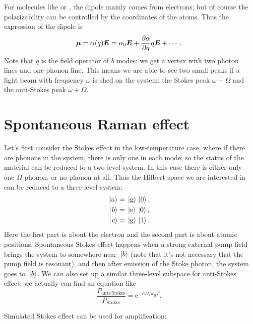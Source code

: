 \documentclass[hyperref, a4paper]{article}
\newcommand*{\ee}{\mathrm{e}}
\newcommand*{\kB}{k_{\text{B}}}
\begin{document}
For molecules like  or ,
the dipole mainly comes from electrons; 
but of course the polarizability can be controlled 
by the coordinates of the atoms.
Thus the expression of the dipole is 
\begin{equation}
    \vb*{\mu} = \alpha(q) \vb*{E} = 
    \alpha_0 \vb*{E} + \pdv{\alpha}{q} q \vb*{E} + \cdots.
\end{equation} 
Note that $q$ is the field operator of $b$ modes:
we get a vertex with two photon lines and one phonon line.
This means we are able to see two small peaks 
if a light beam with frequency $\omega$ is shed on the system:
the Stokes peak $\omega - \Omega$ 
and the anti-Stokes peak $\omega + \Omega$.

\section{Spontaneous Raman effect}

Let's first consider the Stokes effect in the low-temperature case, 
where if there are phonons in the system, 
there is only one in each mode; 
so the status of the material can be reduced to a two-level system.
In this case there is either only one $\Omega$ phonon, or no phonon at all.
Thus the Hilbert space we are interested in can be reduced to 
a three-level system:
\begin{equation}
    \begin{aligned}
        \ket*{a} &= \ket*{\text{g}} \ket*{0}, \\
        \ket*{b} &= \ket*{\text{e}} \ket*{0}, \\
        \ket*{c} &= \ket*{\text{g}} \ket*{1}.
    \end{aligned}
\end{equation}
Here the first part is about the electron 
and the second part is about atomic positions.
Spontaneous Stokes effect happens when a strong external pump field 
brings the system to somewhere near $\ket*{b}$ 
(note that it's not necessary that the pump field is resonant), 
and then after emission of the Stoke photon, 
the system goes to $\ket*{b}$.
We can also set up a similar three-level subspace for anti-Stokes effect; 
we actually can find an equation like 
\begin{equation}
    \frac{P_{\text{anti-Stokes}}}{P_{\text{Stokes}}} = \ee^{- \hbar \Omega / \kB T}.
\end{equation}

Simulated Stokes effect can be used for amplification:
\end{document}

